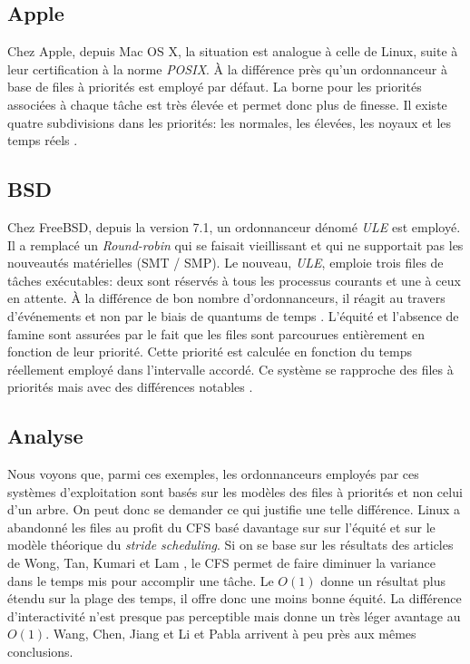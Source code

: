\documentclass[letterpaper]{article}
\begin{document}
\subsection{Apple}

Chez Apple, depuis Mac OS X, la situation est analogue à celle de Linux, suite à leur certification à la norme \textit{POSIX}. À la différence près qu'un ordonnanceur à base de files à priorités est employé par défaut. La borne pour les priorités associées à chaque tâche est très élevée et permet donc plus de finesse. Il existe quatre subdivisions dans les priorités: les normales, les élevées, les noyaux et les temps réels \citep{singh2006mac}.

\subsection{BSD}

Chez FreeBSD, depuis la version 7.1, un ordonnanceur dénomé \textit{ULE} est employé. Il a remplacé un \textit{Round-robin} qui se faisait vieillissant et qui ne supportait pas les nouveautés matérielles (SMT / SMP). Le nouveau, \textit{ULE}, emploie trois files de tâches exécutables: deux sont réservés à tous les processus courants et une à ceux en attente. À la différence de bon nombre d'ordonnanceurs, il réagit au travers d'événements et non par le biais de quantums de temps \citep{roberson2003ule}. L'équité et l'absence de famine sont assurées par le fait que les files sont parcourues entièrement en fonction de leur priorité. Cette priorité est calculée en fonction du temps réellement employé dans l'intervalle accordé. Ce système se rapproche des files à priorités mais avec des différences notables \citep{mckusick2014design}.

\subsection{Analyse}

Nous voyons que, parmi ces exemples, les ordonnanceurs employés par ces systèmes d'exploitation sont basés sur les modèles des files à priorités et non celui d'un arbre. On peut donc se demander ce qui justifie une telle différence. Linux a abandonné les files au profit du CFS basé davantage sur sur l'équité et sur le modèle théorique du \textit{stride scheduling}. Si on se base sur les résultats des articles de Wong, Tan, Kumari et Lam \citep{4631872, Wong:2008:TAF:1400097.1400102}, le CFS permet de faire diminuer la variance dans le temps mis pour accomplir une tâche. Le $O(1)$ donne un résultat plus étendu sur la plage des temps, il offre donc une moins bonne équité. La différence d'interactivité n'est presque pas perceptible mais donne un très léger avantage au $O(1)$. Wang, Chen, Jiang et Li \citep{5279631} et Pabla \citep{Pabla:2009:CFS:1594371.1594375} arrivent à peu près aux mêmes conclusions.
\end{document}
